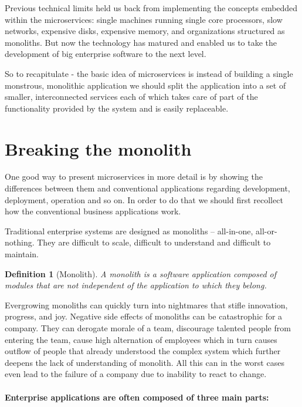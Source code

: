 \documentclass[12pt,oneside]{fithesis2}
\newtheorem{definition}{Definition}
\begin{document}
Previous technical limits held us back from implementing the concepts embedded within the microservices: single machines running single core processors, slow networks, expensive disks, expensive memory, and organizations structured as monoliths. But now the technology has matured and enabled us to take the development of big enterprise software to the next level.

So to recapitulate - the basic idea of microservices is instead of building a single monstrous, monolithic application we should split the application into a set of smaller, interconnected services each of which takes care of part of the functionality provided by the system and is easily replaceable.

\section{Breaking the monolith}

One good way to present microservices in more detail is by showing the differences between them and conventional applications regarding development, deployment, operation and so on. In order to do that we should first recollect how the conventional business applications work.

Traditional enterprise systems are designed as monoliths -- all-in-one, all-or-nothing. They are difficult to scale, difficult to understand and difficult to maintain.

\begin{definition}[Monolith]
A monolith is a software application composed of modules that are not independent of the application to which they belong. \cite{mytat} 
\end{definition}

Evergrowing monoliths can quickly turn into nightmares that stifle innovation, progress, and joy. Negative side effects of monoliths can be catastrophic for a company. They can derogate morale of a team, discourage talented people from entering the team, cause high alternation of employees which in turn causes outflow of people that already understood the complex system which further deepens the lack of understanding of monolith. All this can in the worst cases even lead to the failure of a company due to inability to react to change. \cite{rma}

\paragraph{Enterprise applications are often composed of three main parts:}
\end{document}
